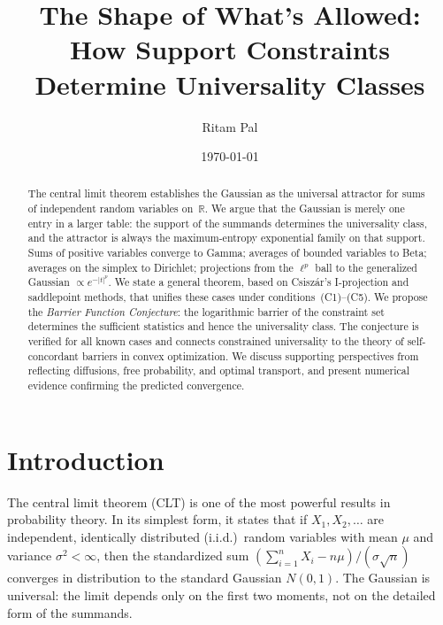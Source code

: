 \documentclass[aps,pre,twocolumn,superscriptaddress,nofootinbib]{revtex4-2}
\theoremstyle{definition}
\theoremstyle{remark}
\newcommand{\R}{\mathbb{R}}
\begin{document}
\title{The Shape of What's Allowed: How Support Constraints Determine Universality Classes}

\author{Ritam Pal}
\affiliation{}

\date{\today}

\begin{abstract}
The central limit theorem establishes the Gaussian as the universal attractor
for sums of independent random variables on~$\R$. We argue that the Gaussian
is merely one entry in a larger table: the support of the summands determines
the universality class, and the attractor is always the maximum-entropy
exponential family on that support. Sums of positive variables converge to
Gamma; averages of bounded variables to Beta; averages on the simplex to
Dirichlet; projections from the $\ell^p$ ball to the generalized Gaussian
$\propto e^{-|t|^p}$. We state a general theorem, based on Csisz\'{a}r's
I-projection and saddlepoint methods, that unifies these cases under
conditions~(C1)--(C5). We propose the \emph{Barrier Function Conjecture}:
the logarithmic barrier of the constraint set determines the sufficient
statistics and hence the universality class. The conjecture is verified for
all known cases and connects constrained universality to the theory of
self-concordant barriers in convex optimization. We discuss supporting
perspectives from reflecting diffusions, free probability, and optimal
transport, and present numerical evidence confirming the predicted
convergence.
\end{abstract}

\maketitle

\section{Introduction}\label{sec:intro}

The central limit theorem (CLT) is one of the most powerful results in
probability theory. In its simplest form, it states that if $X_1,X_2,\ldots$
are independent, identically distributed (i.i.d.)\ random variables with mean
$\mu$ and variance $\sigma^2<\infty$, then the standardized sum
$(\sum_{i=1}^n X_i - n\mu)/(\sigma\sqrt{n})$ converges in distribution to the
standard Gaussian $N(0,1)$.  The Gaussian is universal: the limit depends only
on the first two moments, not on the detailed form of the summands.
\end{document}
